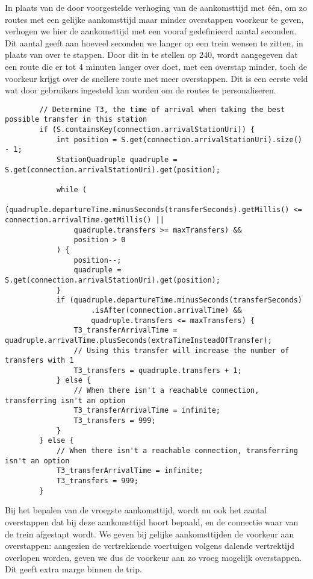 In plaats van de door \cite{strasser17} voorgestelde verhoging van de aankomsttijd met één, om zo routes met een gelijke aankomsttijd maar minder overstappen voorkeur te geven, verhogen we hier de aankomsttijd met een vooraf gedefinieerd aantal seconden. Dit aantal geeft aan hoeveel seconden we langer op een trein wensen te zitten, in plaats van over te stappen. Door dit in te stellen op 240, wordt aangegeven dat een route die er tot 4 minuten langer over doet, met een overstap minder, toch de voorkeur krijgt over de snellere route met meer overstappen. Dit is een eerste veld wat door gebruikers ingesteld kan worden om de routes te personaliseren.

\begin{code}
	\begin{verbatim}
		// Determine T3, the time of arrival when taking the best possible transfer in this station
		if (S.containsKey(connection.arrivalStationUri)) {
			int position = S.get(connection.arrivalStationUri).size() - 1;
			StationQuadruple quadruple = S.get(connection.arrivalStationUri).get(position);
		
			while (
				(quadruple.departureTime.minusSeconds(transferSeconds).getMillis() <= connection.arrivalTime.getMillis() ||
				quadruple.transfers >= maxTransfers) &&  
				position > 0
			) {
				position--;
				quadruple = S.get(connection.arrivalStationUri).get(position);
			}
			if (quadruple.departureTime.minusSeconds(transferSeconds)
					.isAfter(connection.arrivalTime) && 
					quadruple.transfers <= maxTransfers) {
				T3_transferArrivalTime = quadruple.arrivalTime.plusSeconds(extraTimeInsteadOfTransfer);
				// Using this transfer will increase the number of transfers with 1
				T3_transfers = quadruple.transfers + 1;
			} else {
				// When there isn't a reachable connection, transferring isn't an option
				T3_transferArrivalTime = infinite;
				T3_transfers = 999;
			}
		} else {
			// When there isn't a reachable connection, transferring isn't an option
			T3_transferArrivalTime = infinite;
			T3_transfers = 999;
		}
		\end{verbatim}
\end{code}
Bij het bepalen van de vroegste aankomsttijd, wordt nu ook het aantal overstappen dat bij deze aankomsttijd hoort bepaald, en de connectie waar van de trein afgestapt wordt. We geven bij gelijke aankomsttijden de voorkeur aan overstappen: aangezien de vertrekkende voertuigen volgens dalende vertrektijd overlopen worden, geven we dus de voorkeur aan zo vroeg mogelijk overstappen. Dit geeft extra marge binnen de trip.
